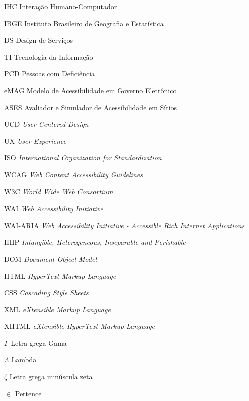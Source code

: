 \documentclass[
  12pt,
  openright,
  twoside,
  a4paper,
  english,
  french,
  spanish,
  brazil
]{abntex2}
\begin{document}
\begin{siglas}
  \item[IHC] Interação Humano-Computador
  \item[IBGE] Instituto Brasileiro de Geografia e Estatística
  \item[DS] Design de Serviços
  \item[TI] Tecnologia da Informação
  \item[PCD] Pessoas com Deficiência
  \item[eMAG] Modelo de Acessibilidade em Governo Eletrônico
  \item[ASES] Avaliador e Simulador de Acessibilidade em Sítios
  \item[UCD] \textit{User-Centered Design}
  \item[UX] \textit{User Experience}
  \item[ISO] \textit{International Organization for Standardization}
  \item[WCAG] \textit{Web Content Accessibility Guidelines}
  \item[W3C] \textit{World Wide Web Consortium}
  \item[WAI] \textit{Web Accessibility Initiative}
  \item[WAI-ARIA] \textit{Web Accessibility Initiative - Accessible Rich Internet Applications}
  \item[IHIP] \textit{Intangible, Heterogeneous, Inseparable and Perishable}
  \item[DOM] \textit{Document Object Model}
  \item[HTML] \textit{HyperText Markup Language}
  \item[CSS] \textit{Cascading Style Sheets}
  \item[XML] \textit{eXtensible Markup Language}
  \item[XHTML] \textit{eXtensible HyperText Markup Language}
\end{siglas}

\begin{simbolos}
  \item[$ \Gamma $] Letra grega Gama
  \item[$ \Lambda $] Lambda
  \item[$ \zeta $] Letra grega minúscula zeta
  \item[$ \in $] Pertence
\end{simbolos}

\tableofcontents*
\cleardoublepage

\textual
\end{document}
